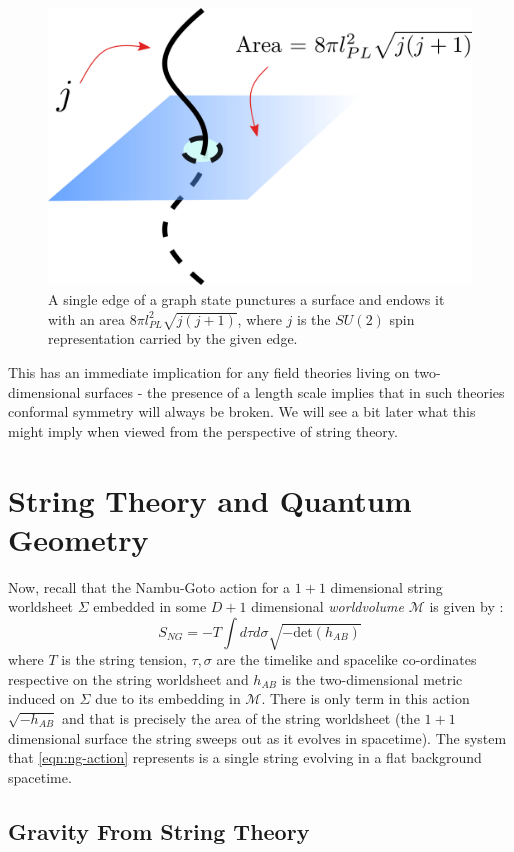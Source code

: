 \documentclass{ws-mpla}
\newcommand{\mc}[1]{\mathcal{#1}}
\begin{document}
\begin{figure}[tbph]
\centering
\includegraphics[width=0.4\linewidth]{area_puncture}
\caption{A single edge of a graph state punctures a surface and endows it with an area $ 8\pi l^2_{PL} \sqrt{j (j + 1)} $, where $ j $ is the $ SU(2) $ spin representation carried by the given edge.}
\label{fig:area-puncture}
\end{figure}


This has an immediate implication for any field theories living on two-dimensional surfaces - the presence of a length scale implies that in such theories conformal symmetry will always be broken. We will see a bit later what this might imply when viewed from the perspective of string theory.

\section{String Theory and Quantum Geometry}\label{sec:string-geometry}

Now, recall that the Nambu-Goto action for a $ 1+1 $ dimensional string worldsheet $ \Sigma $ embedded in some $ D+1 $ dimensional \emph{worldvolume} $ \mc{M} $ is given by \cite{t-Hooft2004Introduction,Tong2010Lectures,Zwiebach2009A-First}:
\begin{equation}\label{eqn:ng-action}
	S_{NG} = -T \int d\tau d\sigma \sqrt{-\text{det} (h_{AB})}
\end{equation}
where $ T $ is the string tension, $ \tau, \sigma $ are the timelike and spacelike co-ordinates respective on the string worldsheet and $ h_{AB} $ is the two-dimensional metric induced on $ \Sigma $ due to its embedding in $ \mc{M} $. There is only term in this action $ \sqrt{-h_{AB}} $ and that is precisely the area of the string worldsheet (the $ 1+1 $ dimensional surface the string sweeps out as it evolves in spacetime). The system that \eqref{eqn:ng-action} represents is a single string evolving in a flat background spacetime.

\subsection{Gravity From String Theory}
\end{document}
